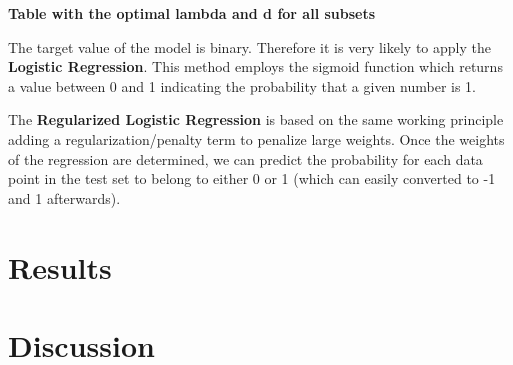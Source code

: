 \documentclass[10pt,conference,compsocconf]{IEEEtran}
\begin{document}
\textbf{Table with the optimal lambda and d for all subsets}

The target value of the model is binary. Therefore it is very likely to apply the \textbf{Logistic Regression}. This method employs the sigmoid function which returns a value between 0 and 1 indicating the probability that a given number is 1.

The \textbf{Regularized Logistic Regression} is based on the same working principle adding a regularization/penalty term to penalize large weights. Once the weights of the regression are determined, we can predict the probability for each data point in the test set to belong to either 0 or 1 (which can easily converted to -1 and 1 afterwards).

\section{Results}
\label{sec:results}

\section{Discussion}
\label{sec:discussion}



%


\end{document}
